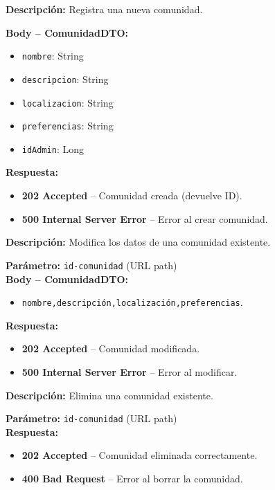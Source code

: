 \begin{tcolorbox}[title=\texttt{POST /comunidades/}, colback=blue!5!white, colframe=blue!80!black]
\textbf{Descripción:} Registra una nueva comunidad.

\textbf{Body – ComunidadDTO:}
\begin{itemize}[label=--]
    \item \texttt{nombre}: String  
    \item \texttt{descripcion}: String  
    \item \texttt{localizacion}: String  
    \item \texttt{preferencias}: String
    \item \texttt{idAdmin}: Long
\end{itemize}

\textbf{Respuesta:}
\begin{itemize}[label=--]
    \item \textbf{202 Accepted} – Comunidad creada (devuelve ID).
    \item \textbf{500 Internal Server Error} – Error al crear comunidad.
\end{itemize}
\end{tcolorbox}

\begin{tcolorbox}[title=\texttt{PATCH /comunidades/\{id-comunidad\}}, colback=blue!5, colframe=blue!80!black]
\textbf{Descripción:} Modifica los datos de una comunidad existente.

\textbf{Parámetro:} \texttt{id-comunidad} (URL path) \\

\textbf{Body – ComunidadDTO:}
\begin{itemize}[label=--]
    \item \texttt{nombre,descripción,localización,preferencias}.
\end{itemize}

\textbf{Respuesta:}
\begin{itemize}[label=--]
    \item \textbf{202 Accepted} – Comunidad modificada.
    \item \textbf{500 Internal Server Error} – Error al modificar.
\end{itemize}
\end{tcolorbox}

\begin{tcolorbox}[title=\texttt{DELETE /comunidades/delete/\{id-comunidad\}}, colback=blue!5, colframe=blue!80!black]
\textbf{Descripción:} Elimina una comunidad existente.

\textbf{Parámetro:} \texttt{id-comunidad} (URL path) \\

\textbf{Respuesta:}
\begin{itemize}[label=--]
    \item \textbf{202 Accepted} – Comunidad eliminada correctamente.
    \item \textbf{400 Bad Request} – Error al borrar la comunidad.
\end{itemize}
\end{tcolorbox}

